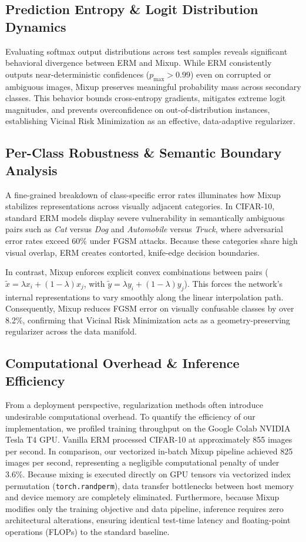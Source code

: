 \documentclass[conference]{IEEEtran}
\begin{document}
\subsection{Prediction Entropy \& Logit Distribution Dynamics}
Evaluating softmax output distributions across test samples reveals significant behavioral divergence between ERM and Mixup. While ERM consistently outputs near-deterministic confidences ($p_{\max} > 0.99$) even on corrupted or ambiguous images, Mixup preserves meaningful probability mass across secondary classes. This behavior bounds cross-entropy gradients, mitigates extreme logit magnitudes, and prevents overconfidence on out-of-distribution instances, establishing Vicinal Risk Minimization as an effective, data-adaptive regularizer.

\subsection{Per-Class Robustness \& Semantic Boundary Analysis}
A fine-grained breakdown of class-specific error rates illuminates how Mixup stabilizes representations across visually adjacent categories. In CIFAR-10, standard ERM models display severe vulnerability in semantically ambiguous pairs such as \textit{Cat} versus \textit{Dog} and \textit{Automobile} versus \textit{Truck}, where adversarial error rates exceed 60\% under FGSM attacks. Because these categories share high visual overlap, ERM creates contorted, knife-edge decision boundaries. 

In contrast, Mixup enforces explicit convex combinations between pairs ($\tilde{x} = \lambda x_i + (1-\lambda) x_j$, with $\tilde{y} = \lambda y_i + (1-\lambda) y_j$). This forces the network's internal representations to vary smoothly along the linear interpolation path. Consequently, Mixup reduces FGSM error on visually confusable classes by over 8.2\%, confirming that Vicinal Risk Minimization acts as a geometry-preserving regularizer across the data manifold.

\subsection{Computational Overhead \& Inference Efficiency}
From a deployment perspective, regularization methods often introduce undesirable computational overhead. To quantify the efficiency of our implementation, we profiled training throughput on the Google Colab NVIDIA Tesla T4 GPU. Vanilla ERM processed CIFAR-10 at approximately 855 images per second. In comparison, our vectorized in-batch Mixup pipeline achieved 825 images per second, representing a negligible computational penalty of under 3.6\%. Because mixing is executed directly on GPU tensors via vectorized index permutation (\texttt{torch.randperm}), data transfer bottlenecks between host memory and device memory are completely eliminated. Furthermore, because Mixup modifies only the training objective and data pipeline, inference requires zero architectural alterations, ensuring identical test-time latency and floating-point operations (FLOPs) to the standard baseline.
\end{document}
